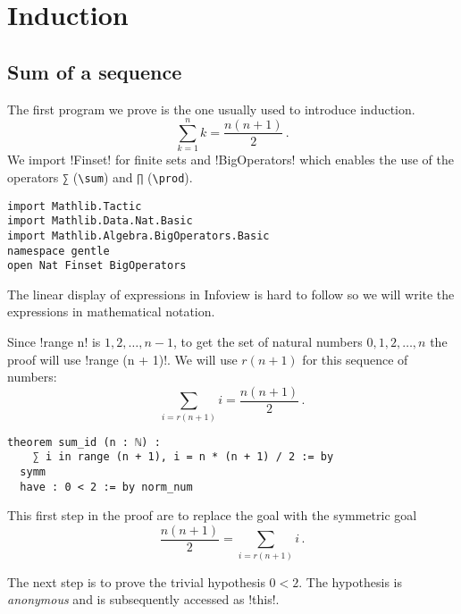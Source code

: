 
\section{Induction}

\subsection{Sum of a sequence}

The first program we prove is the one usually used to introduce induction. \[
\sum_{k=1}^{n} k = \frac{n(n+1)}{2}\,.
\]
We import !Finset! for finite sets and !BigOperators! which enables the use of the operators \Verb+∑+ (\Verb+\sum+) and \Verb+∏+  (\Verb+\prod+).
\begin{Verbatim}
import Mathlib.Tactic
import Mathlib.Data.Nat.Basic
import Mathlib.Algebra.BigOperators.Basic
namespace gentle
open Nat Finset BigOperators
\end{Verbatim}



The linear display of expressions in Infoview is hard to follow so we will write the expressions in mathematical notation.

Since !range n! is $1,2,\ldots,n-1$, to get the set of natural numbers $0, 1,2,\ldots,n$ the proof will use !range (n + 1)!. We will use $r(n+1)$ for this sequence of numbers:
\[
\sum_{i=r(n+1)} i = \frac{n(n+1)}{2}\,.
\]
\begin{Verbatim}[firstnumber=last]
theorem sum_id (n : ℕ) :
    ∑ i in range (n + 1), i = n * (n + 1) / 2 := by
  symm
  have : 0 < 2 := by norm_num
\end{Verbatim}

This first step in the proof are to replace the goal with the symmetric goal
\[
\frac{n(n+1)}{2} = \sum_{i=r(n+1)} i\,.
\]


The next step is to prove the trivial hypothesis $0<2$. The hypothesis is \emph{anonymous} and is subsequently accessed as !this!.

